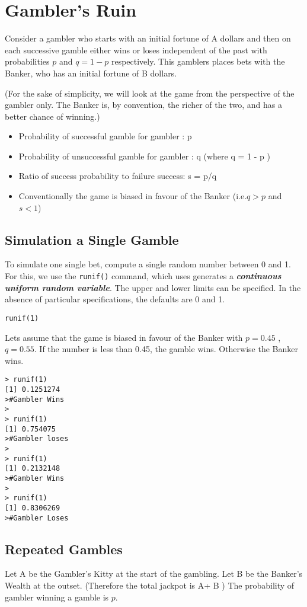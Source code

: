 \documentclass[11pt]{article} %
\begin{document}
\section{Gambler's Ruin}
Consider a gambler who starts with an initial fortune of A dollars and then on each successive gamble
either wins  or loses independent of the past with probabilities $p$ and $q = 1- p$ respectively.
This gamblers places bets with the Banker, who has an initial fortune of B dollars. 

(For the sake of simplicity, we will look at the game from the perspective of the gambler only. The Banker is, by convention, the richer of the two, and has a better chance of winning.)

\begin{itemize}
\item Probability of successful gamble for gambler : p
\item Probability of unsuccessful gamble for gambler : q (where q = 1 - p )
\item Ratio of success probability to failure success: s = p/q
\item Conventionally the game is biased in favour of the Banker (i.e.$ q > p$ and $s < 1$)
\end{itemize}


\subsection{Simulation a Single Gamble}
To simulate one single bet, compute a single random number between 0 and 1. For this, we 
use the \texttt{runif()} command, which uses generates a \textbf{\textit{continuous uniform random variable}}. The upper and lower limits can be specified. In the absence of particular specifications, the defaults are 0 and 1.
\begin{framed}
\begin{verbatim}
runif(1)
\end{verbatim}
\end{framed}
Lets assume that the game is biased in favour of the Banker with $p = 0.45$ ,$q = 0.55$. If the
number is less than 0.45, the gamble wins. Otherwise the Banker wins.
\begin{verbatim}
> runif(1)
[1] 0.1251274
>#Gambler Wins
>
> runif(1)
[1] 0.754075
>#Gambler loses
>
> runif(1)
[1] 0.2132148
>#Gambler Wins
>
> runif(1)
[1] 0.8306269
>#Gambler Loses
\end{verbatim}
\newpage
\subsection{Repeated Gambles}
Let A be the Gambler's Kitty at the start of the gambling. Let B be the Banker's Wealth at the outset. (Therefore the total jackpot is A+ B )
The probability of gambler winning a gamble is $p$.
\end{document}
